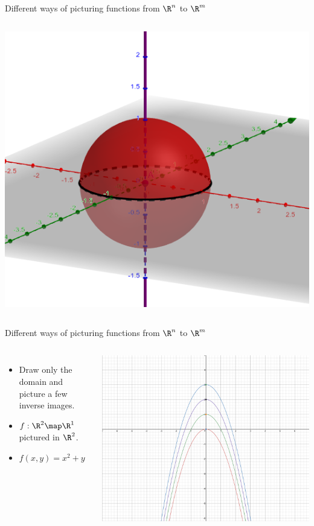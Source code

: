 \documentclass{beamer}
\begin{document}
\begin{frame}{Different ways of picturing functions from $\R^n$ to $\R^m$}
\begin{columns}
\includegraphics[scale=0.15]{sphere2}
\end{columns}

\end{frame}


\begin{frame}{Different ways of picturing functions from $\R^n$ to $\R^m$}

\begin{columns}
\column[T]{5cm}
\begin{itemize}
\item Draw only the domain and picture a few inverse images.
\item $f:\R^2\map\R^1$ pictured in $\R^2$.
\item $f(x,y) = x^2 + y$
\end{itemize}

\column[T]{5cm}
\includegraphics[scale=0.1]{contour-parabolas}

\end{columns}

\end{frame}
\end{document}
